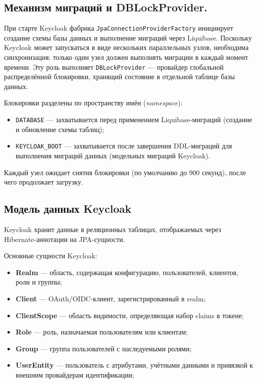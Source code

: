 \documentclass[times]{itmo-student-thesis}
\begin{document}
\subsection{Механизм миграций и DBLockProvider.}
При старте Keycloak фабрика \texttt{JpaConnectionProviderFactory} инициирует создание схемы базы данных и
выполнение миграций через Liquibase. Поскольку Keycloak может запускаться в виде нескольких параллельных
узлов, необходима синхронизация: только один узел должен выполнять миграции в каждый момент времени.
Эту роль выполняет \texttt{DBLockProvider} --- провайдер глобальной распределённой блокировки, хранящий
состояние в отдельной таблице базы данных.

Блокировки разделены по пространству имён (\textit{namespace}):
\begin{itemize}
    \item \texttt{DATABASE} --- захватывается перед применением Liquibase-миграций (создание и обновление схемы таблиц);
    \item \texttt{KEYCLOAK\_BOOT} --- захватывается после завершения DDL-миграций для выполнения миграций данных (модельных миграций Keycloak).
\end{itemize}
Каждый узел ожидает снятия блокировки (по умолчанию до 900 секунд), после чего продолжает загрузку.

\subsection{Модель данных Keycloak}

Keycloak хранит данные в реляционных таблицах, отображаемых через Hibernate-аннотации на JPA-сущности.

Основные сущности Keycloak:

\begin{itemize}
    \item \textbf{Realm} --- область, содержащая конфигурацию, пользователей, клиентов, роли и группы; 
    \item \textbf{Client} --- OAuth/OIDC-клиент, зарегистрированный в realm; 
    \item \textbf{ClientScope} --- область видимости, определяющая набор claims в токене; 
    \item \textbf{Role} --- роль, назначаемая пользователям или клиентам; 
    \item \textbf{Group} --- группа пользователей с наследуемыми ролями; 
    \item \textbf{UserEntity} --- пользователь с атрибутами, учётными данными и привязкой к внешним провайдерам идентификации;
\end{itemize}
\end{document}
